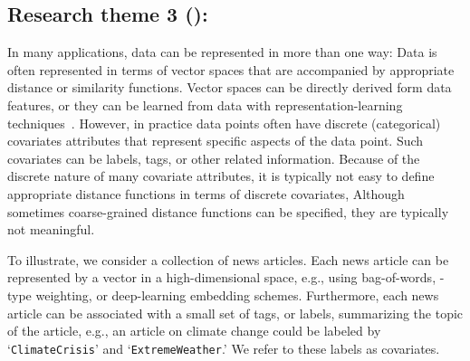 \documentclass[a4paper,11pt]{article}
\begin{document}


\subsection*{Research theme 3 (\rth): \covariates}

In many applications, data can be represented in more than one way: 
Data is often represented in terms of vector spaces that are
accompanied by appropriate distance or similarity functions.
Vector spaces can be directly derived form data features, 
or they can be learned from data with representation-learning techniques~\cite{hamilton2017representation,wang2020survey}.
However, in practice data points often have discrete (categorical) covariates attributes
that represent specific aspects of the data point. 
Such covariates can be labels, tags, or other related information.
Because of the discrete nature of many covariate attributes, 
it is typically not easy to define appropriate distance functions in terms of discrete covariates, 
Although sometimes coarse-grained distance functions can be specified,
they are typically not meaningful.

To illustrate, 
we consider a collection of news articles. 
Each news article can be represented by a vector in a high-dimensional space, 
e.g., using bag-of-words, \tfidf-type weighting, or deep-learning embedding schemes. 
Furthermore, each news article can be associated with a small 
set of tags, or labels, summarizing the topic of the article, 
e.g., an article on climate change could be labeled by
`\texttt{\small ClimateCrisis}' and `\texttt{\small ExtremeWeather}.'
We refer to these labels as covariates.
\end{document}
